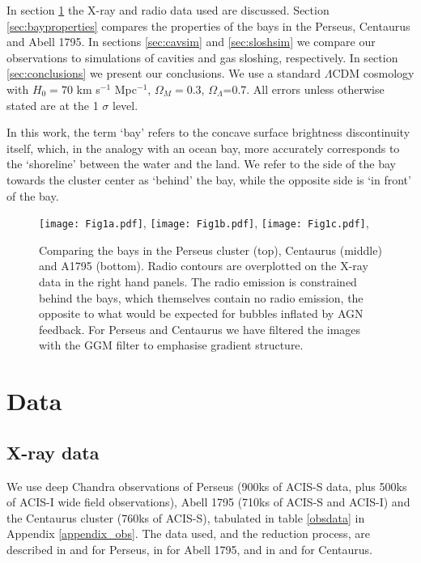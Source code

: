 \documentclass[useAMS,usenatbib]{mn2e}
\begin{document}
In section \ref{sec:data} the X-ray and radio data used are discussed. Section \ref{sec:bayproperties} compares
the properties of the bays in the Perseus, Centaurus and Abell 1795. In sections \ref{sec:cavsim} and \ref{sec:sloshsim} we 
compare our observations to simulations of cavities and gas sloshing, respectively. In section \ref{sec:conclusions} we present our conclusions. We use a standard $\Lambda$CDM cosmology with $H_{0}=70$  km s$^{-1}$
Mpc$^{-1}$, $\Omega_{M}=0.3$, $\Omega_{\Lambda}$=0.7. All errors unless
otherwise stated are at the 1 $\sigma$ level. 

In this work, the term `bay' refers to the concave surface brightness discontinuity itself, which, in the analogy with 
an ocean bay, more accurately corresponds to the `shoreline' between the water and the land. We refer to the side of the bay towards the 
cluster center as `behind' the bay, while the opposite side is `in front' of the bay.  

\begin{figure*}
  \begin{center}
    \leavevmode
\texttt{[image: Fig1a.pdf]},
	\texttt{[image: Fig1b.pdf]},
\texttt{[image: Fig1c.pdf]},

      \caption{Comparing the bays in the Perseus cluster (top), Centaurus
(middle) and A1795 (bottom). Radio contours are overplotted on the X-ray data in the right hand panels.
The radio emission is constrained behind the bays, which themselves contain no
radio emission, the opposite to what would be expected for bubbles inflated by
AGN feedback. For Perseus and Centaurus we have filtered the images with the GGM filter to emphasise gradient structure.}
      \label{compare_xraywithradio}
  \end{center}
\end{figure*}

\section{Data}
\label{sec:data}
\subsection{X-ray data}
We use deep Chandra observations of Perseus (900ks of ACIS-S data, plus 500ks of ACIS-I wide field observations), 
Abell 1795 (710ks of ACIS-S and ACIS-I) and the
Centaurus cluster (760ks of ACIS-S), tabulated in table \ref{obsdata} in Appendix \ref{appendix_obs}. The data used, and the reduction process, are described in \citet{Fabian2006} and 
\citet{Fabian2011} for Perseus, in \citet{Walker2014_A1795} for Abell 1795, and in \citet{Sanders2016} and \citet{Walker2015c}
for Centaurus. 
\end{document}
